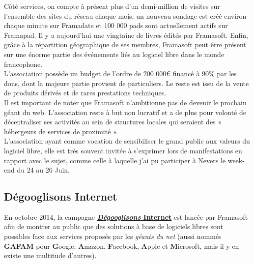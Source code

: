 \documentclass[10pt,a4paper, twoside]{report}
\begin{document}
	Côté services, on compte à présent plus d'un demi-million de visites sur l'ensemble des sites du réseau chaque mois, un nouveau sondage est créé environ chaque minute sur Framadate et 100 000 pads sont actuellement actifs sur Framapad. Il y a aujourd'hui une vingtaine de livres édités par Framasoft. Enfin, grâce à la répartition géographique de ses membres, Framasoft peut être présent sur une énorme partie des événements liés au logiciel libre dans le monde francophone.
	\\
	
	L'association possède un budget de l'ordre de 200 000\euro{} financé à 90\% par les dons, dont la majeure partie provient de particuliers. Le reste est issu de la vente de produits dérivés et de rares prestations techniques.
	\\
	
	Il est important de noter que Framasoft n'ambitionne pas de devenir le prochain géant du web. L'association reste à but non lucratif et a de plus pour volonté de décentraliser ses activités au sein de structures locales qui seraient des « hébergeurs de services de proximité ».
	\\
		
	L'association ayant comme vocation de sensibiliser le grand public aux valeurs du logiciel libre, elle est très souvent invitée à s'exprimer lors de manifestations en rapport avec le sujet, comme celle à laquelle j'ai pu participer à Nevers le week-end du 24 au 26 Juin.
	
	\subsection{Dégooglisons Internet}
	\label{subsec:degoogl}
	
	En octobre 2014, la campagne \href{https://degooglisons-internet.org/}{\textbf{\textit{Dégooglisons} Internet}} est lancée par Framasoft afin de montrer au public que des solutions à base de logiciels libres sont possibles face aux services proposés par les \textit{géants du net} (aussi nommés \textbf{GAFAM} pour \textbf{G}oogle, \textbf{A}mazon, \textbf{F}acebook, \textbf{A}pple et \textbf{M}icrosoft, mais il y en existe une multitude d'autres).
	
\end{document}
